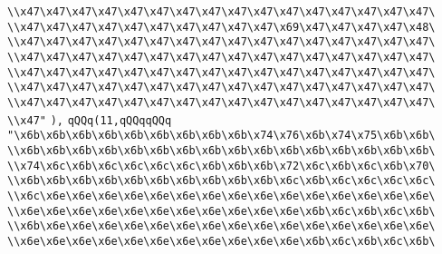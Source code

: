 \verb|\\x47\x47\x47\x47\x47\x47\x47\x47\x47\x47\x47\x47\x47\x47\x47\x47\|\newline
\verb|\\x47\x47\x47\x47\x47\x47\x47\x47\x47\x47\x69\x47\x47\x47\x47\x48\|\newline
\verb|\\x47\x47\x47\x47\x47\x47\x47\x47\x47\x47\x47\x47\x47\x47\x47\x47\|\newline
\verb|\\x47\x47\x47\x47\x47\x47\x47\x47\x47\x47\x47\x47\x47\x47\x47\x47\|\newline
\verb|\\x47\x47\x47\x47\x47\x47\x47\x47\x47\x47\x47\x47\x47\x47\x47\x47\|\newline
\verb|\\x47\x47\x47\x47\x47\x47\x47\x47\x47\x47\x47\x47\x47\x47\x47\x47\|\newline
\verb|\\x47\x47\x47\x47\x47\x47\x47\x47\x47\x47\x47\x47\x47\x47\x47\x47\|\newline
\verb|\\x47"|\newline
\verb|),|\newline
\verb|qQQq(11,qQQqqQQq|\newline
\verb|"\x6b\x6b\x6b\x6b\x6b\x6b\x6b\x6b\x6b\x74\x76\x6b\x74\x75\x6b\x6b\|\newline
\verb|\\x6b\x6b\x6b\x6b\x6b\x6b\x6b\x6b\x6b\x6b\x6b\x6b\x6b\x6b\x6b\x6b\|\newline
\verb|\\x74\x6c\x6b\x6c\x6c\x6c\x6c\x6b\x6b\x6b\x72\x6c\x6b\x6c\x6b\x70\|\newline
\verb|\\x6b\x6b\x6b\x6b\x6b\x6b\x6b\x6b\x6b\x6b\x6c\x6b\x6c\x6c\x6c\x6c\|\newline
\verb|\\x6c\x6e\x6e\x6e\x6e\x6e\x6e\x6e\x6e\x6e\x6e\x6e\x6e\x6e\x6e\x6e\|\newline
\verb|\\x6e\x6e\x6e\x6e\x6e\x6e\x6e\x6e\x6e\x6e\x6e\x6b\x6c\x6b\x6c\x6b\|\newline
\verb|\\x6b\x6e\x6e\x6e\x6e\x6e\x6e\x6e\x6e\x6e\x6e\x6e\x6e\x6e\x6e\x6e\|\newline
\verb|\\x6e\x6e\x6e\x6e\x6e\x6e\x6e\x6e\x6e\x6e\x6e\x6b\x6c\x6b\x6c\x6b\|\newline
